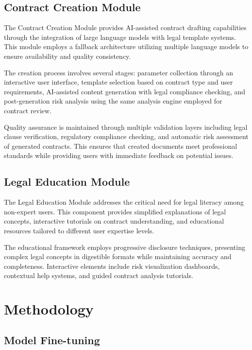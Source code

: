 \documentclass[conference]{IEEEtran}
\begin{document}
\subsection{Contract Creation Module}

The Contract Creation Module provides AI-assisted contract drafting capabilities through the integration of large language models with legal template systems. This module employs a fallback architecture utilizing multiple language models to ensure availability and quality consistency.

The creation process involves several stages: parameter collection through an interactive user interface, template selection based on contract type and user requirements, AI-assisted content generation with legal compliance checking, and post-generation risk analysis using the same analysis engine employed for contract review.

Quality assurance is maintained through multiple validation layers including legal clause verification, regulatory compliance checking, and automatic risk assessment of generated contracts. This ensures that created documents meet professional standards while providing users with immediate feedback on potential issues.

\subsection{Legal Education Module}

The Legal Education Module addresses the critical need for legal literacy among non-expert users. This component provides simplified explanations of legal concepts, interactive tutorials on contract understanding, and educational resources tailored to different user expertise levels.

The educational framework employs progressive disclosure techniques, presenting complex legal concepts in digestible formats while maintaining accuracy and completeness. Interactive elements include risk visualization dashboards, contextual help systems, and guided contract analysis tutorials.

\section{Methodology}

\subsection{Model Fine-tuning}
\end{document}
